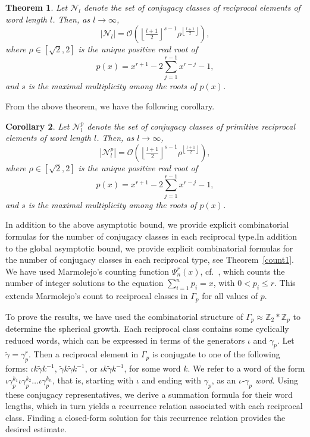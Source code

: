 \documentclass[11pt]{amsart}
\numberwithin{equation}{section}
\newtheorem{theorem}{Theorem}[section]
\newtheorem{cor}[theorem]{Corollary}
\theoremstyle{definition}
\newcommand{\gt}{\tilde{\gamma}}
\newcommand{\g}{\gamma_{p}}
\newcommand{\io}{\iota }
\newcommand{\thmref}[1]{Theorem~\ref{#1}}
\numberwithin{equation}{section}
\begin{document}
	\begin{theorem} \label{mthm}
		Let $\mathcal{N}_l$ denote the set of conjugacy classes of reciprocal elements of word length $l$. Then, as $l \to \infty$,
		$$|\mathcal{N}_l| = \mathcal{O}\left(\left\lfloor \tfrac{l+1}{2} \right\rfloor^{s-1} \rho^{\left\lfloor \tfrac{l+1}{2} \right\rfloor} \right),
		$$
		where $\rho \in [\sqrt{2}, 2]$ is the unique positive real root of
		$$
		p(x) = x^{r+1} - 2\sum_{j=1}^{r-1} x^{r-j} - 1,
		$$
		and $s$ is the maximal multiplicity among the roots of $p(x)$.
	\end{theorem}
    From the above theorem, we have the following corollary.
    \begin{cor}\label{cor1}
	Let $\mathcal{N}^{p}_l$ denote the set of conjugacy classes of primitive reciprocal elements of word length $l$. Then, as $l \to \infty$,
$$|\mathcal{N}^{p}_l| = \mathcal{O}\left(\left\lfloor \tfrac{l+1}{2} \right\rfloor^{s-1} \rho^{\left\lfloor \tfrac{l+1}{2} \right\rfloor} \right),
$$
where $\rho \in [\sqrt{2}, 2]$ is the unique positive real root of
$$
p(x) = x^{r+1} - 2\sum_{j=1}^{r-1} x^{r-j} - 1,
$$
and $s$ is the maximal multiplicity among the roots of $p(x)$.

		\end{cor}
	In addition to the above asymptotic bound, we provide explicit combinatorial formulas for the number of conjugacy classes in each reciprocal type.In addition to the global asymptotic bound, we provide explicit combinatorial formulas for the number of conjugacy classes in each reciprocal type, see \thmref{count1}. We have used Marmolejo's counting function $\Psi^r_n(x)$, cf.~\cite{Ma}, which counts the number of integer solutions to the equation $\sum_{i=1}^n p_i = x$, with $0 < p_i \leq r$. This extends Marmolejo's count to reciprocal classes in $\Gamma_p$ for all values of $p$.
	
	To prove the results, we have used the combinatorial structure of $\Gamma_p \approx \mathbb Z_2 \ast \mathbb Z_p$ to determine the spherical growth.   
	Each reciprocal class contains some cyclically reduced words, which can be expressed in terms of the generators $\iota$ and $\g$. Let $\gt = \g^r$. Then a reciprocal element in $\Gamma_p$ is conjugate to one of the following forms: $\iota k \gt k^{-1}$, $\gt k \gt k^{-1}$, or $\iota k \gt k^{-1}$, for some word $k$. We refer to a word of the form $\iota \g ^{k_1}\io \g^{k_2}\dots \io \g^{k_n}$, that is, starting with $\iota$ and ending with $\g$, as an \emph{$\iota$-$\g$ word}. Using these conjugacy representatives, we derive a summation formula for their word lengths, which in turn yields a recurrence relation associated with each reciprocal class. Finding a closed-form solution for this recurrence relation provides the desired estimate.
\end{document}
